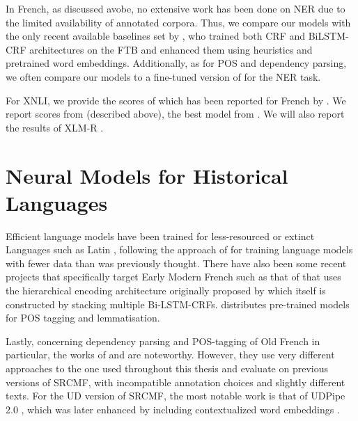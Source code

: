 In French, as discussed avobe, no extensive work has been done on NER due to the limited availability of annotated corpora. Thus, we compare our models with the only recent available baselines set by \citet{dupont-2017-exploration}, who trained both CRF \citep{lafferty-etal-2001-conditional} and BiLSTM-CRF \citep{lample-etal-2016-neural} architectures on the FTB and enhanced them using heuristics and pretrained word embeddings. Additionally, as for POS and dependency parsing, we often compare our models to a fine-tuned version of \mbert for the NER task.

For XNLI, we provide the scores of \mbert which has been reported for French by \citet{wu-dredze-2019-beto}. We report scores from \xlmmlmtlm (described above), the best model from \citet{conneau-lample-2019-cross}. We will also report the results of \mbox{XLM-R} \citep{conneau-etal-2020-unsupervised}.

\section{Neural Models for Historical Languages}

Efficient language models have been trained for less-resourced or extinct Languages such as Latin \citep{bamman-burns-2020-latin}, following the approach of \citet{martin-etal-2020-camembert} for training language models with fewer data than was previously thought. There have also been some recent projects that specifically target Early Modern French such as that of \pieextended \citep{clerice-2020-pie} that uses the hierarchical encoding architecture originally proposed by \citet{manjavacas-etal-2019-improving} which itself is constructed by stacking multiple Bi-LSTM-CRFs. \citet{clerice-2020-pie} distributes pre-trained models for POS tagging and lemmatisation.

Lastly, concerning dependency parsing and POS-tagging of Old French in particular, the works of \citet{guibon-etal-2014-parsing} and \citet{stein-2014-parsing, stein-2016-old} are noteworthy. However, they use very different approaches to the one used throughout this thesis and evaluate on previous versions of SRCMF, with incompatible annotation choices and slightly different texts. For the UD version of SRCMF, the most notable work is that of UDPipe 2.0 \citep{straka-2018-udpipe}, which was later enhanced by including contextualized word embeddings \citep{straka-strakova-2019-evaluating}.
